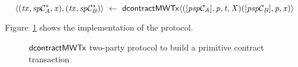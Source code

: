 \[ \langle (\mathit{tx}, \mathit{sp}\mathcal{C}_{\mathit{A}}^*, \mathit{x}), (\mathit{tx}, \mathit{sp}\mathcal{C}_{\mathit{B}}^*) \rangle ~\leftarrow~ \mathsf{dcontractMWTx} \langle([\mathit{psp}\mathcal{C}_{\mathit{A}}],\mathit{p},\mathit{t},\mathit{X}) ([\mathit{psp}\mathcal{C}_{\mathit{B}}],\mathit{p},\mathit{x}) \rangle \]

Figure~\ref{fig:d-script-tx} shows the implementation of the protocol.

\begin{figure}
    \caption{$\mathsf{dcontractMWTx}$ two-party protocol to build a primitive contract transaction} \label{fig:d-script-tx}
\end{figure}







